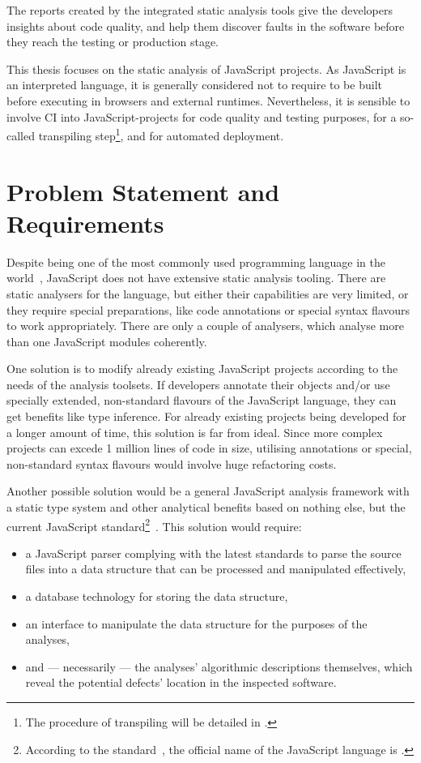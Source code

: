 The reports created by the integrated static analysis tools give the developers insights about code quality, and help them discover faults in the software before they reach the testing or production stage.

This thesis focuses on the static analysis of JavaScript projects. As JavaScript is an interpreted language, it is generally considered not to require to be built before executing in browsers and external runtimes. Nevertheless, it is sensible to involve CI into JavaScript-projects for code quality and testing purposes, for a so-called transpiling step\footnote{The procedure of transpiling will be detailed in .}, and for automated deployment.


\section{Problem Statement and Requirements}

Despite being one of the most commonly used programming language in the world~\cite{javascriptstackoverflow}, JavaScript does not have extensive static analysis tooling. There are static analysers for the language, but either their capabilities are very limited, or they require special preparations, like code annotations or special syntax flavours to work appropriately. There are only a couple of analysers, which analyse more than one JavaScript modules coherently.

One solution is to modify already existing JavaScript projects according to the needs of the analysis toolsets. If developers annotate their objects and/or use specially extended, non-standard flavours of the JavaScript language, they can get benefits like type inference. For already existing projects being developed for a longer amount of time, this solution is far from ideal. Since more complex projects can excede 1 million lines of code in size, utilising annotations or special, non-standard syntax flavours would involve huge refactoring costs.

Another possible solution would be a general JavaScript analysis framework with a static type system and other analytical benefits based on nothing else, but the current JavaScript standard\footnote{According to the standard~\cite{ecmascriptstandard}, the official name of the JavaScript language is \es.}~\cite{ecmascriptstandard}. This solution would require:

\begin{itemize}
\item a JavaScript parser complying with the latest \es standards to parse the source files into a data structure that can be processed and manipulated effectively,
\item a database technology for storing the data structure,
\item an interface to manipulate the data structure for the purposes of the analyses,
\item and — necessarily — the analyses' algorithmic descriptions themselves, which reveal the potential defects' location in the inspected software.
\end{itemize}

